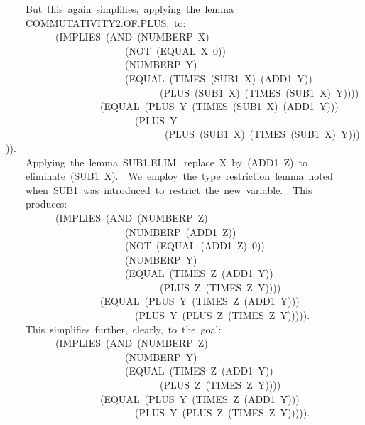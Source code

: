 \documentclass[11pt]{book}
\newenvironment{pubasis}{\begin{flushleft}\ttfamily\small}{\normalsize\rmfamily\end{flushleft}}
\begin{document}
\begin{pubasis}
~~~~But~this~again~simplifies,~applying~the~lemma\\
~~~~COM\-MU\-TA\-TIV\-ITY2.OF.PLUS,~to:\\

~~~~~~~~~~(IMPLIES~(AND~(NUMBERP~X)\\
~~~~~~~~~~~~~~~~~~~~~~~~(NOT~(EQUAL~X~0))\\
~~~~~~~~~~~~~~~~~~~~~~~~(NUMBERP~Y)\\
~~~~~~~~~~~~~~~~~~~~~~~~(EQUAL~(TIMES~(SUB1~X)~(ADD1~Y))\\
~~~~~~~~~~~~~~~~~~~~~~~~~~~~~~~(PLUS~(SUB1~X)~(TIMES~(SUB1~X)~Y))))\\
~~~~~~~~~~~~~~~~~~~(EQUAL~(PLUS~Y~(TIMES~(SUB1~X)~(ADD1~Y)))\\
~~~~~~~~~~~~~~~~~~~~~~~~~~(PLUS~Y\\
~~~~~~~~~~~~~~~~~~~~~~~~~~~~~~~~(PLUS~(SUB1~X)~(TIMES~(SUB1~X)~Y))))).\\

~~~~Applying~the~lemma~SUB1.ELIM,~replace~X~by~(ADD1~Z)~to\\
~~~~eliminate~(SUB1~X).~~We~employ~the~type~restriction~lemma~noted\\
~~~~when~SUB1~was~introduced~to~restrict~the~new~variable.~~This\\
~~~~produces:\\

~~~~~~~~~~(IMPLIES~(AND~(NUMBERP~Z)\\
~~~~~~~~~~~~~~~~~~~~~~~~(NUMBERP~(ADD1~Z))\\
~~~~~~~~~~~~~~~~~~~~~~~~(NOT~(EQUAL~(ADD1~Z)~0))\\
~~~~~~~~~~~~~~~~~~~~~~~~(NUMBERP~Y)\\
~~~~~~~~~~~~~~~~~~~~~~~~(EQUAL~(TIMES~Z~(ADD1~Y))\\
~~~~~~~~~~~~~~~~~~~~~~~~~~~~~~~(PLUS~Z~(TIMES~Z~Y))))\\
~~~~~~~~~~~~~~~~~~~(EQUAL~(PLUS~Y~(TIMES~Z~(ADD1~Y)))\\
~~~~~~~~~~~~~~~~~~~~~~~~~~(PLUS~Y~(PLUS~Z~(TIMES~Z~Y))))).\\

~~~~This~simplifies~further,~clearly,~to~the~goal:\\

~~~~~~~~~~(IMPLIES~(AND~(NUMBERP~Z)\\
~~~~~~~~~~~~~~~~~~~~~~~~(NUMBERP~Y)\\
~~~~~~~~~~~~~~~~~~~~~~~~(EQUAL~(TIMES~Z~(ADD1~Y))\\
~~~~~~~~~~~~~~~~~~~~~~~~~~~~~~~(PLUS~Z~(TIMES~Z~Y))))\\
~~~~~~~~~~~~~~~~~~~(EQUAL~(PLUS~Y~(TIMES~Z~(ADD1~Y)))\\
~~~~~~~~~~~~~~~~~~~~~~~~~~(PLUS~Y~(PLUS~Z~(TIMES~Z~Y))))).\\


\end{pubasis}
\end{document}
